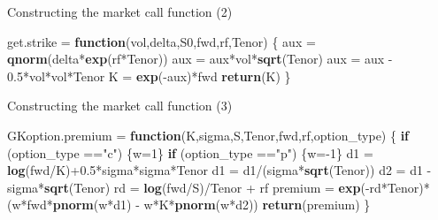\documentclass[ignorenonframetext,aspectratio=169]{beamer}
\newenvironment{Shaded}{}{}
\newcommand{\KeywordTok}[1]{\textcolor[rgb]{0.00,0.44,0.13}{\textbf{#1}}}
\newcommand{\DecValTok}[1]{\textcolor[rgb]{0.25,0.63,0.44}{#1}}
\newcommand{\FloatTok}[1]{\textcolor[rgb]{0.25,0.63,0.44}{#1}}
\newcommand{\StringTok}[1]{\textcolor[rgb]{0.25,0.44,0.63}{#1}}
\newcommand{\ControlFlowTok}[1]{\textcolor[rgb]{0.00,0.44,0.13}{\textbf{#1}}}
\newcommand{\OperatorTok}[1]{\textcolor[rgb]{0.40,0.40,0.40}{#1}}
\newcommand{\NormalTok}[1]{#1}
\begin{document}
\begin{frame}[fragile]{Constructing the market call function (2)}

\begin{Shaded}
\begin{Highlighting}[]
\NormalTok{get.strike =}\StringTok{ }\ControlFlowTok{function}\NormalTok{(vol,delta,S0,fwd,rf,Tenor)}
\NormalTok{\{}
\NormalTok{  aux =}\StringTok{ }\KeywordTok{qnorm}\NormalTok{(delta}\OperatorTok{*}\KeywordTok{exp}\NormalTok{(rf}\OperatorTok{*}\NormalTok{Tenor))}
\NormalTok{  aux =}\StringTok{ }\NormalTok{aux}\OperatorTok{*}\NormalTok{vol}\OperatorTok{*}\KeywordTok{sqrt}\NormalTok{(Tenor)}
\NormalTok{  aux =}\StringTok{ }\NormalTok{aux }\OperatorTok{-}\StringTok{ }\FloatTok{0.5}\OperatorTok{*}\NormalTok{vol}\OperatorTok{*}\NormalTok{vol}\OperatorTok{*}\NormalTok{Tenor}
\NormalTok{  K =}\StringTok{ }\KeywordTok{exp}\NormalTok{(}\OperatorTok{-}\NormalTok{aux)}\OperatorTok{*}\NormalTok{fwd}
  \KeywordTok{return}\NormalTok{(K)}
\NormalTok{\}}
\end{Highlighting}
\end{Shaded}

\end{frame}

\begin{frame}[fragile]{Constructing the market call function (3)}

\begin{Shaded}
\begin{Highlighting}[]
\NormalTok{GKoption.premium =}\StringTok{ }\ControlFlowTok{function}\NormalTok{(K,sigma,S,Tenor,fwd,rf,option_type)}
\NormalTok{\{}
  \ControlFlowTok{if}\NormalTok{ (option_type }\OperatorTok{==}\StringTok{"c"}\NormalTok{) \{w=}\DecValTok{1}\NormalTok{\}}
  \ControlFlowTok{if}\NormalTok{ (option_type }\OperatorTok{==}\StringTok{"p"}\NormalTok{) \{w=}\OperatorTok{-}\DecValTok{1}\NormalTok{\}}
\NormalTok{  d1 =}\StringTok{ }\KeywordTok{log}\NormalTok{(fwd}\OperatorTok{/}\NormalTok{K)}\OperatorTok{+}\FloatTok{0.5}\OperatorTok{*}\NormalTok{sigma}\OperatorTok{*}\NormalTok{sigma}\OperatorTok{*}\NormalTok{Tenor}
\NormalTok{  d1 =}\StringTok{ }\NormalTok{d1}\OperatorTok{/}\NormalTok{(sigma}\OperatorTok{*}\KeywordTok{sqrt}\NormalTok{(Tenor))}
\NormalTok{  d2 =}\StringTok{ }\NormalTok{d1 }\OperatorTok{-}\StringTok{ }\NormalTok{sigma}\OperatorTok{*}\KeywordTok{sqrt}\NormalTok{(Tenor)}
\NormalTok{  rd =}\StringTok{ }\KeywordTok{log}\NormalTok{(fwd}\OperatorTok{/}\NormalTok{S)}\OperatorTok{/}\NormalTok{Tenor }\OperatorTok{+}\StringTok{ }\NormalTok{rf}
\NormalTok{  premium =}\StringTok{ }\KeywordTok{exp}\NormalTok{(}\OperatorTok{-}\NormalTok{rd}\OperatorTok{*}\NormalTok{Tenor)}\OperatorTok{*}\NormalTok{(w}\OperatorTok{*}\NormalTok{fwd}\OperatorTok{*}\KeywordTok{pnorm}\NormalTok{(w}\OperatorTok{*}\NormalTok{d1) }\OperatorTok{-}\StringTok{ }\NormalTok{w}\OperatorTok{*}\NormalTok{K}\OperatorTok{*}\KeywordTok{pnorm}\NormalTok{(w}\OperatorTok{*}\NormalTok{d2))}
  \KeywordTok{return}\NormalTok{(premium)}
\NormalTok{\}}
\end{Highlighting}
\end{Shaded}

\end{frame}
\end{document}
